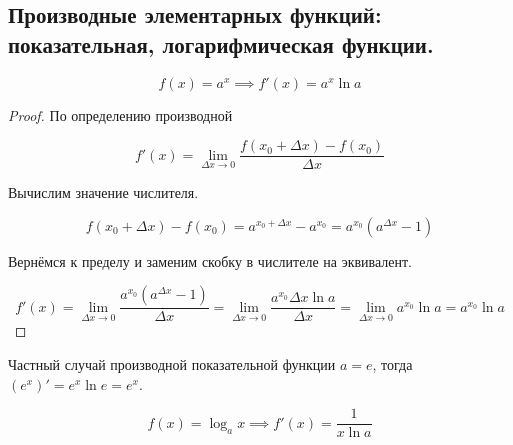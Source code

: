 \subsection{%
  Производные элементарных функций: показательная, логарифмическая функции.%
}

\begin{theorem}
  \begin{equation*}
    f(x) = a^x \implies f'(x) = a^x \ln a    
  \end{equation*}
\end{theorem}

\begin{proof}
  По определению производной 

  \begin{equation*}
    f'(x) = \lim_{\Delta x \to 0} \frac{f(x_0 + \Delta x) - f(x_0)}{\Delta x}
  \end{equation*}

  Вычислим значение числителя.

  \begin{equation*}
    f(x_0 + \Delta x) - f(x_0)
    =  a^{x_0 + \Delta x} - a^{x_0}
    = a^{x_0} (a^{\Delta x} - 1)
  \end{equation*}

  Вернёмся к пределу и заменим скобку  в числителе на эквивалент.

  \begin{equation*}
    f'(x) = \lim_{\Delta x \to 0} \frac{a^{x_0}(a^{\Delta x} - 1)}{\Delta x}
    = \lim_{\Delta x \to 0} \frac{a^{x_0} \Delta x \ln a}{\Delta x}
    = \lim_{\Delta x \to 0}{a^{x_0} \ln a}
    = a^{x_0} \ln a
  \end{equation*}
\end{proof}

\begin{remark}
  Частный случай производной показательной функции \(a = e\), тогда \((e^x)' =
  e^x \ln e = e^x\).
\end{remark}

\begin{theorem}
  \begin{equation*}
    f(x) = \log_a x \implies f'(x) = \frac{1}{x \ln a}
  \end{equation*}  
\end{theorem}

